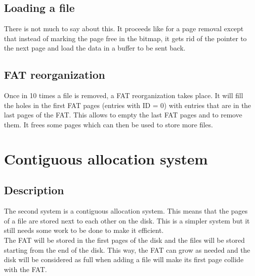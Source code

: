 \documentclass[10pt,a4paper]{ULBreport}
\begin{document}
\subsection{Loading a file}
There is not much to say about this. It proceeds like for a page removal except that instead of marking the page free in the bitmap, it gets rid of the pointer to the next page and load the data in a buffer to be sent back.
\subsection{FAT reorganization}
Once in 10 times a file is removed, a FAT reorganization takes place. It will fill the holes in the first FAT pages (entries with ID = 0) with entries that are in the last pages of the FAT. This allows to empty the last FAT pages and to remove them. It frees some pages which can then be used to store more files.

\section{Contiguous allocation system}
\label{sec:contiguous}
\subsection{Description}
The second system is a contiguous allocation system. This means that the pages of a file are stored next to each other on the disk. This is a simpler system but it still needs some work to be done to make it efficient. \\
The FAT will be stored in the first pages of the disk and the files will be stored starting from the end of the disk. This way, the FAT can grow as needed and the disk will be considered as full when adding a file will make its first page collide with the FAT.
\end{document}
